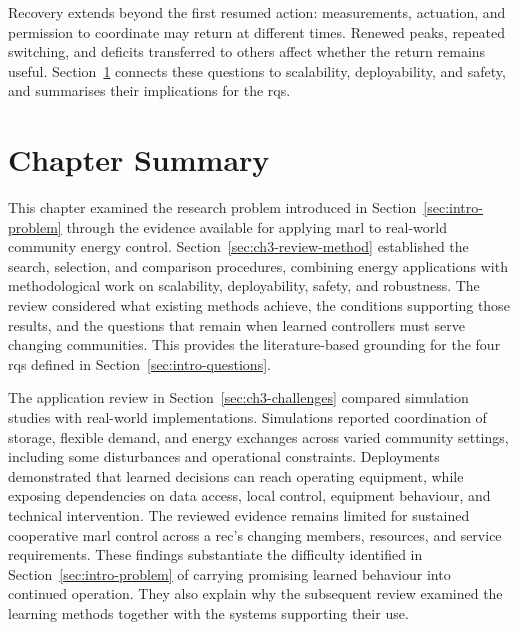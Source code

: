 Recovery extends beyond the first resumed action: measurements, actuation, and permission to coordinate may return at different times. Renewed peaks, repeated switching, and deficits transferred to others affect whether the return remains useful. Section~\ref{sec:ch3-synthesis} connects these questions to scalability, deployability, and safety, and summarises their implications for the \glspl{rq}.


\FloatBarrier
\section{Chapter Summary}
\label{sec:ch3-synthesis}
\label{sec:ch2-gaps}

This chapter examined the research problem introduced in Section~\ref{sec:intro-problem} through the evidence available for applying \gls{marl} to real-world community energy control. Section~\ref{sec:ch3-review-method} established the search, selection, and comparison procedures, combining energy applications with methodological work on scalability, deployability, safety, and robustness. The review considered what existing methods achieve, the conditions supporting those results, and the questions that remain when learned controllers must serve changing communities. This provides the literature-based grounding for the four \glspl{rq} defined in Section~\ref{sec:intro-questions}.

The application review in Section~\ref{sec:ch3-challenges} compared simulation studies with real-world implementations. Simulations reported coordination of storage, flexible demand, and energy exchanges across varied community settings, including some disturbances and operational constraints. Deployments demonstrated that learned decisions can reach operating equipment, while exposing dependencies on data access, local control, equipment behaviour, and technical intervention. The reviewed evidence remains limited for sustained cooperative \gls{marl} control across a \gls{rec}'s changing members, resources, and service requirements. These findings substantiate the difficulty identified in Section~\ref{sec:intro-problem} of carrying promising learned behaviour into continued operation. They also explain why the subsequent review examined the learning methods together with the systems supporting their use.

